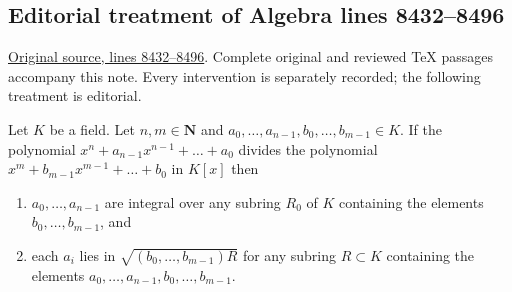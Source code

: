 \subsection{Editorial treatment of Algebra lines 8432--8496}

\hypertarget{algebra-context-094}{}

\noindent\href{https://github.com/stacks/stacks-project/blob/a04446e57ec1fbc252a871afcec7752fb2807b14/algebra.tex\#L8432}{Original source, lines 8432--8496}. Complete original and reviewed TeX passages accompany this note. Every intervention is separately recorded; the following treatment is editorial.


\begin{lemma}
\label{editorial-source-lemma-polynomials-divide}
Let $K$ be a field. Let $n, m \in \mathbf{N}$ and
$a_0, \ldots, a_{n - 1}, b_0, \ldots, b_{m - 1} \in K$.
If the polynomial $x^n + a_{n - 1}x^{n - 1} + \ldots + a_0$
divides the polynomial $x^m + b_{m - 1} x^{m - 1} + \ldots + b_0$
in $K[x]$ then
\begin{enumerate}
\item $a_0, \ldots, a_{n - 1}$ are integral over any subring
$R_0$ of $K$ containing the elements $b_0, \ldots, b_{m - 1}$, and
\item each $a_i$ lies in $\sqrt{(b_0, \ldots, b_{m-1})R}$
for any subring $R \subset K$ containing the elements
$a_0, \ldots, a_{n - 1}, b_0, \ldots, b_{m - 1}$.
\end{enumerate}
\end{lemma}


